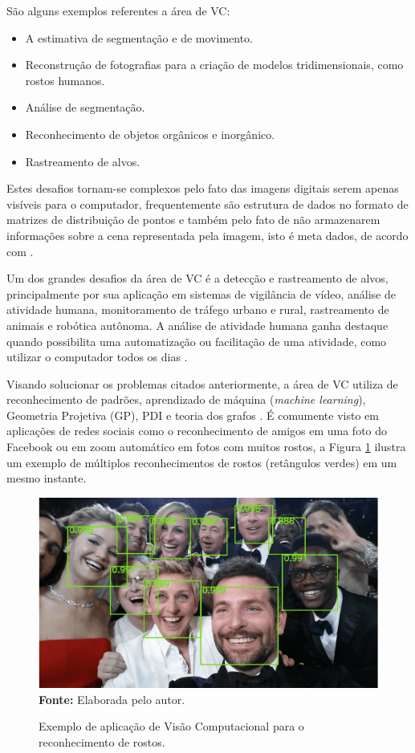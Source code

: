 São alguns exemplos referentes a área de VC: 
\begin{itemize}
\item A estimativa de segmentação e de movimento.
\item Reconstrução de fotografias para a criação de modelos tridimensionais, como rostos humanos.
\item Análise de segmentação.
\item Reconhecimento de objetos orgânicos e inorgânico.
\item Rastreamento de alvos.
\end{itemize}

Estes desafios tornam-se complexos pelo fato das imagens digitais serem apenas visíveis para o computador, frequentemente são estrutura de dados no formato de matrizes de distribuição de pontos e também pelo fato de não armazenarem informações sobre a cena representada pela imagem, isto é meta dados, de acordo com .

Um dos grandes desafios da área de VC é a detecção e rastreamento de alvos, principalmente por sua aplicação em sistemas de vigilância de vídeo, análise de atividade humana, monitoramento de tráfego urbano e rural, rastreamento de animais e robótica autônoma. A análise de atividade humana ganha destaque quando possibilita uma automatização ou facilitação de uma atividade, como utilizar o computador todos os dias \cite{alaya2012multipeople-UPPERCASE}.

Visando solucionar os problemas citados anteriormente, a área de VC utiliza de reconhecimento de padrões, aprendizado de máquina (\textit{machine learning}), Geometria Projetiva (GP), PDI e teoria dos grafos \cite{prince2012computer}. É comumente visto em aplicações de redes sociais como o reconhecimento de amigos em uma foto do Facebook ou em zoom automático em fotos com muitos rostos, a Figura \ref{fig:exemplo-vc} ilustra um exemplo de múltiplos reconhecimentos de rostos (retângulos verdes) em um mesmo instante.

\begin{figure}[htbp]
\caption{Exemplo de aplicação de Visão Computacional para o reconhecimento de rostos.}
 \centering \includegraphics[scale=1]{img/figura-1.png}
 \textbf{Fonte:} Elaborada pelo autor.
\label{fig:exemplo-vc}
\end{figure}

